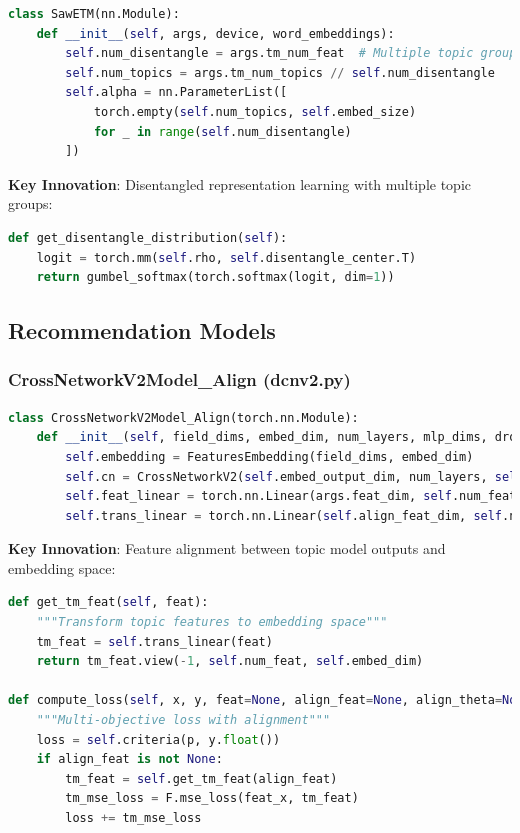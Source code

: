 \begin{lstlisting}[language=Python, caption=SawETM Architecture]
class SawETM(nn.Module):
    def __init__(self, args, device, word_embeddings):
        self.num_disentangle = args.tm_num_feat  # Multiple topic groups
        self.num_topics = args.tm_num_topics // self.num_disentangle
        self.alpha = nn.ParameterList([
            torch.empty(self.num_topics, self.embed_size) 
            for _ in range(self.num_disentangle)
        ])
\end{lstlisting}

\textbf{Key Innovation}: Disentangled representation learning with multiple topic groups:

\begin{lstlisting}[language=Python, caption=Disentangled Distribution]
def get_disentangle_distribution(self):
    logit = torch.mm(self.rho, self.disentangle_center.T)
    return gumbel_softmax(torch.softmax(logit, dim=1))
\end{lstlisting}

\subsection{Recommendation Models}

\subsubsection{CrossNetworkV2Model\_Align (dcnv2.py)}

\begin{lstlisting}[language=Python, caption=DCN-V2 with Alignment]
class CrossNetworkV2Model_Align(torch.nn.Module):
    def __init__(self, field_dims, embed_dim, num_layers, mlp_dims, dropout, args, item_dataset):
        self.embedding = FeaturesEmbedding(field_dims, embed_dim)
        self.cn = CrossNetworkV2(self.embed_output_dim, num_layers, self.num_fields, embed_dim)
        self.feat_linear = torch.nn.Linear(args.feat_dim, self.num_feat * embed_dim)
        self.trans_linear = torch.nn.Linear(self.align_feat_dim, self.num_feat * self.embed_dim)
\end{lstlisting}

\textbf{Key Innovation}: Feature alignment between topic model outputs and embedding space:

\begin{lstlisting}[language=Python, caption=Topic Feature Transformation]
def get_tm_feat(self, feat):
    """Transform topic features to embedding space"""
    tm_feat = self.trans_linear(feat)
    return tm_feat.view(-1, self.num_feat, self.embed_dim)

def compute_loss(self, x, y, feat=None, align_feat=None, align_theta=None):
    """Multi-objective loss with alignment"""
    loss = self.criteria(p, y.float())
    if align_feat is not None:
        tm_feat = self.get_tm_feat(align_feat)
        tm_mse_loss = F.mse_loss(feat_x, tm_feat)
        loss += tm_mse_loss
\end{lstlisting}

